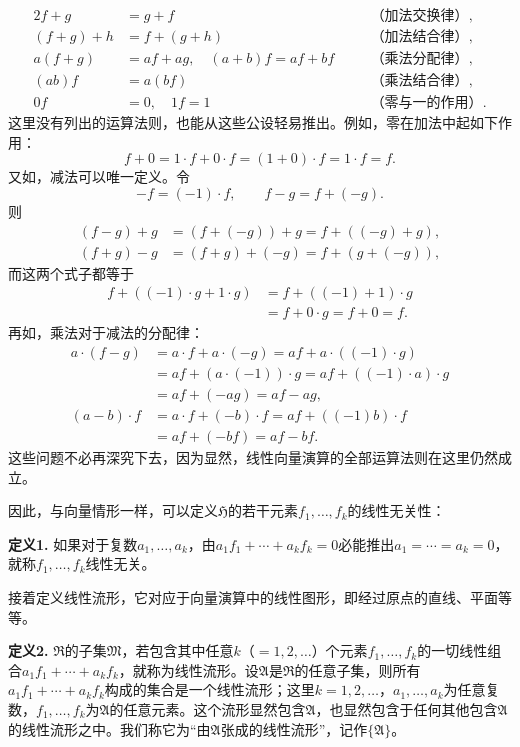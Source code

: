 \documentclass[fontsize=13pt,twoside,openany,headings=normal,parskip=false,bookmarkpackage=false,DIV=calc]{scrbook}
\begin{document}
\hypertarget{origpage-20}{}\label{origpage-20}\begin{alignat*}{2}
f+g&=g+f &\quad &\text{（加法交换律）},\\
(f+g)+h&=f+(g+h)&\quad &\text{（加法结合律）},\\
a(f+g)&=af+ag,\quad (a+b)f=af+bf
&\quad &\text{（乘法分配律）},\\
(ab)f&=a(bf)&\quad &\text{（乘法结合律）},\\
0f&=0,\quad 1f=1&\quad &\text{（零与一的作用）}.
\end{alignat*}
这里没有列出的运算法则，也能从这些公设轻易推出。例如，零在加法中起如下作用：
\[
f+0=1\cdot f+0\cdot f=(1+0)\cdot f=1\cdot f=f.
\]
又如，减法可以唯一定义。令
\[
-f=(-1)\cdot f,\qquad f-g=f+(-g).
\]
则
\begin{align*}
(f-g)+g&=(f+(-g))+g=f+((-g)+g),\\
(f+g)-g&=(f+g)+(-g)=f+(g+(-g)),
\end{align*}
而这两个式子都等于
\begin{align*}
f+((-1)\cdot g+1\cdot g)
&=f+((-1)+1)\cdot g\\
&=f+0\cdot g=f+0=f.
\end{align*}
再如，乘法对于减法的分配律：
\begin{align*}
a\cdot(f-g)&=a\cdot f+a\cdot(-g)=af+a\cdot((-1)\cdot g)\\
&=af+(a\cdot(-1))\cdot g=af+((-1)\cdot a)\cdot g\\
&=af+(-ag)=af-ag,\\
(a-b)\cdot f&=a\cdot f+(-b)\cdot f=af+((-1)b)\cdot f\\
&=af+(-bf)=af-bf.
\end{align*}
这些问题不必再深究下去，因为显然，线性向量演算的全部运算法则在这里仍然成立。

因此，与向量情形一样，可以定义$\mathfrak{H}$的若干元素$f_1,\allowbreak \ldots,\allowbreak f_k$的线性无关性：

\leavevmode{}\textbf{定义1.}\label{def:II.1} 如果对于复数$a_1,\allowbreak \ldots,\allowbreak a_k$，由$a_1f_1+\cdots+a_kf_k=0$必能推出$a_1=\cdots=a_k=0$，就称$f_1,\allowbreak \ldots,\allowbreak f_k$线性无关。

接着定义线性流形，它对应于向量演算中的线性图形，即经过原点的直线、平面等等。

\leavevmode{}\textbf{定义2.}\label{def:II.2} $\mathfrak{R}$的子集$\mathfrak{M}$，若包含其中任意$k$（$=1,\allowbreak 2,\allowbreak \ldots$）个元素$f_1,\allowbreak \ldots,\allowbreak f_k$的一切线性组合$a_1f_1+\cdots+a_kf_k$，就称为线性流形。设$\mathfrak{A}$是$\mathfrak{R}$的任意子集，则所有$a_1f_1+\cdots+a_kf_k$构成的集合是一个线性流形；这里$k=1,\allowbreak 2,\allowbreak \ldots$，$a_1,\allowbreak \ldots,\allowbreak a_k$为任意复数，$f_1,\allowbreak \ldots,\allowbreak f_k$为$\mathfrak{A}$的任意元素。这个流形显然包含$\mathfrak{A}$，也显然包含于任何其他包含$\mathfrak{A}$的线性流形之中。\hypertarget{origpage-21}{}\label{origpage-21}我们称它为“由$\mathfrak{A}$张成的线性流形”，记作$\{\mathfrak{A}\}$。
\end{document}
